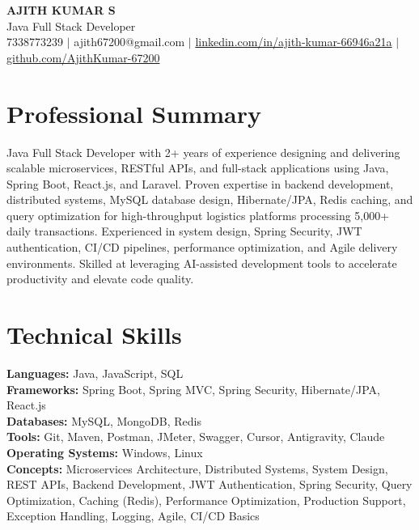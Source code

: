 \documentclass[a4paper,10pt]{article}
\begin{document}
\pagestyle{empty}

\begin{center}
    {\LARGE \textbf{\color{headingblue} AJITH KUMAR S}}\\
    \vspace{3pt}
    Java Full Stack Developer \\
    \vspace{3pt}
    7338773239 $|$ ajith67200@gmail.com $|$
    \href{https://linkedin.com/in/ajith-kumar-66946a21a}{linkedin.com/in/ajith-kumar-66946a21a} $|$
    \href{https://github.com/AjithKumar-67200}{github.com/AjithKumar-67200}
\end{center}

\vspace{-12pt}

\section*{Professional Summary}
Java Full Stack Developer with 2+ years of experience designing and delivering scalable microservices, RESTful APIs, and full-stack applications using Java, Spring Boot, React.js, and Laravel. Proven expertise in backend development, distributed systems, MySQL database design, Hibernate/JPA, Redis caching, and query optimization for high-throughput logistics platforms processing 5,000+ daily transactions. Experienced in system design, Spring Security, JWT authentication, CI/CD pipelines, performance optimization, and Agile delivery environments. Skilled at leveraging AI-assisted development tools to accelerate productivity and elevate code quality.

\vspace{-12pt}

\section*{Technical Skills}
\textbf{Languages:} Java, JavaScript, SQL \\
\textbf{Frameworks:} Spring Boot, Spring MVC, Spring Security, Hibernate/JPA, React.js \\
\textbf{Databases:} MySQL, MongoDB, Redis \\
\textbf{Tools:} Git, Maven, Postman, JMeter, Swagger, Cursor, Antigravity, Claude \\
\textbf{Operating Systems:} Windows, Linux \\
\textbf{Concepts:} Microservices Architecture, Distributed Systems, System Design, REST APIs, Backend Development, JWT Authentication, Spring Security, Query Optimization, Caching (Redis), Performance Optimization, Production Support, Exception Handling, Logging, Agile, CI/CD Basics
\end{document}
